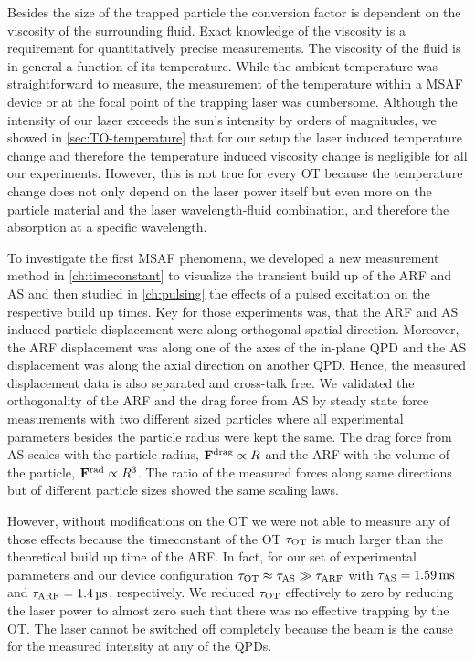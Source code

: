 Besides the size of the trapped particle the conversion factor is dependent on 
the viscosity of the surrounding fluid. Exact knowledge of the viscosity is a 
requirement for quantitatively precise measurements. The viscosity of the fluid 
is in general a function of its temperature. While the ambient temperature was 
straightforward to measure, the measurement of the temperature within a MSAF 
device or at the focal point of the trapping laser was cumbersome. Although the 
intensity of our laser exceeds the sun's intensity by orders of magnitudes, we 
showed in \cref{sec:TO-temperature} that for our setup the laser induced 
temperature change and therefore the temperature induced viscosity change is 
negligible for all our experiments. However, this is not true for every OT 
because the temperature change does not only depend on the laser power itself 
but even more on the particle material and the laser wavelength-fluid 
combination, and therefore the absorption at a specific wavelength.

To investigate the first MSAF phenomena, we developed a new measurement method 
in \cref{ch:timeconstant} to visualize the transient build up of the ARF and AS 
and then studied in \cref{ch:pulsing} the effects of a pulsed excitation on the 
respective build up times. Key for those experiments was, that the ARF and AS 
induced particle displacement were along orthogonal spatial direction. 
Moreover, the ARF displacement was along one of the axes of the in-plane QPD 
and the AS displacement was along the axial direction on another QPD. Hence, 
the measured displacement data is also separated and cross-talk free. We 
validated the orthogonality of the ARF and the drag force from AS by steady 
state force measurements with two different sized particles where all 
experimental parameters besides the particle radius were kept the same. The 
drag force from AS scales with the particle radius, $\vb{F}^{\mathrm{drag}}\propto R$ and the ARF 
with the volume of the particle, $\vb{F}^{\mathrm{rad}}\propto R^{3}$. The ratio of the 
measured forces along same directions but of different particle sizes showed 
the same scaling laws. 

However, without modifications on the OT we were not able to measure any of 
those effects because the timeconstant of the OT $\tau_{\mathrm{OT}}$ is much larger than the 
theoretical build up time of the ARF. In fact, for our set of experimental 
parameters and our device configuration $\tau_{\mathrm{OT}} \approx \tau_{\mathrm{AS}} \gg \tau_{\mathrm{ARF}}$ with 
$\tas = \SI{1.59}{\ms}$ and $\tarf = \SI{1.4}{\us}$, respectively. We reduced 
$\tau_{\mathrm{OT}}$ effectively to zero by reducing the laser power to almost zero such that 
there was no effective trapping by the OT. The laser cannot be switched off 
completely because the beam is the cause for the measured intensity at any of 
the QPDs.

